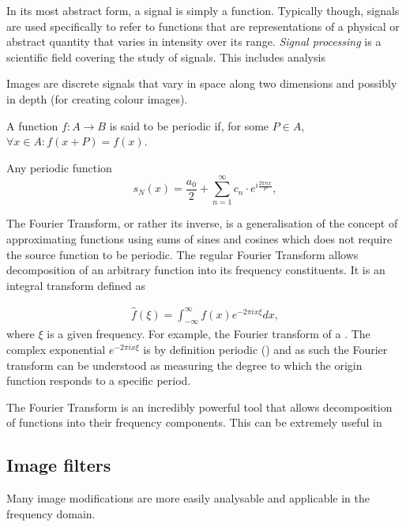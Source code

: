 In its most abstract form, a signal is simply a function. Typically though, signals are used specifically to refer to functions that are representations of a physical or abstract quantity that varies in intensity over its range. \emph{Signal processing} is a scientific field covering the study of signals. This includes analysis 

Images are discrete signals that vary in space along two dimensions and possibly in depth (for creating colour images). 


\begin{definition}
A function $f: A \rightarrow B$ is said to be periodic if, for some $P\in A$, $\forall x\in A: f(x+P) = f(x)$.
\end{definition}

\begin{definition}
Any periodic function 
\begin{equation}
    s_N(x) = \frac{a_0}{2} + \sum_{n=1}^\infty c_n \cdot e^{i\frac{2\pi n x}{P}},
\end{equation}

\end{definition}

The Fourier Transform, or rather its inverse, is a generalisation of the concept of approximating functions using sums of sines and cosines which does not require the source function to be periodic. The regular Fourier Transform allows decomposition of an arbitrary function into its frequency constituents. It is an integral transform defined as

\begin{align*}
	\hat{f}(\xi) = \int_{-\infty}^{\infty} f(x) e^{-2\pi i x\xi}dx,
\end{align*}
where $\xi$ is a given frequency. For example, the Fourier transform of a . The complex exponential $e^{-2\pi i x\xi}$ is by definition periodic () and as such the Fourier transform can be understood as measuring the degree to which the origin function responds to a specific period.

The Fourier Transform is an incredibly powerful tool that allows decomposition of functions into their frequency components. This can be extremely useful in 



\subsection{Image filters}
Many image modifications are more easily analysable and applicable in the frequency domain. 

